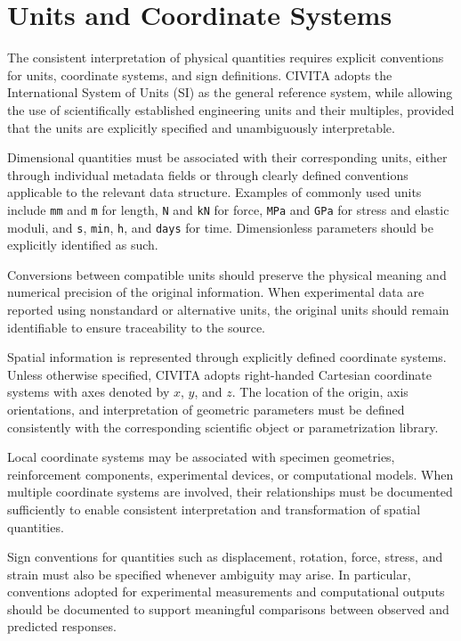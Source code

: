 \section{Units and Coordinate Systems}

The consistent interpretation of physical quantities requires explicit conventions for units, coordinate systems, and sign definitions. CIVITA adopts the International System of Units (SI) as the general reference system, while allowing the use of scientifically established engineering units and their multiples, provided that the units are explicitly specified and unambiguously interpretable.

Dimensional quantities must be associated with their corresponding units, either through individual metadata fields or through clearly defined conventions applicable to the relevant data structure. Examples of commonly used units include \texttt{mm} and \texttt{m} for length, \texttt{N} and \texttt{kN} for force, \texttt{MPa} and \texttt{GPa} for stress and elastic moduli, and \texttt{s}, \texttt{min}, \texttt{h}, and \texttt{days} for time. Dimensionless parameters should be explicitly identified as such.

Conversions between compatible units should preserve the physical meaning and numerical precision of the original information. When experimental data are reported using nonstandard or alternative units, the original units should remain identifiable to ensure traceability to the source.

Spatial information is represented through explicitly defined coordinate systems. Unless otherwise specified, CIVITA adopts right-handed Cartesian coordinate systems with axes denoted by $x$, $y$, and $z$. The location of the origin, axis orientations, and interpretation of geometric parameters must be defined consistently with the corresponding scientific object or parametrization library.

Local coordinate systems may be associated with specimen geometries, reinforcement components, experimental devices, or computational models. When multiple coordinate systems are involved, their relationships must be documented sufficiently to enable consistent interpretation and transformation of spatial quantities.

Sign conventions for quantities such as displacement, rotation, force, stress, and strain must also be specified whenever ambiguity may arise. In particular, conventions adopted for experimental measurements and computational outputs should be documented to support meaningful comparisons between observed and predicted responses.


